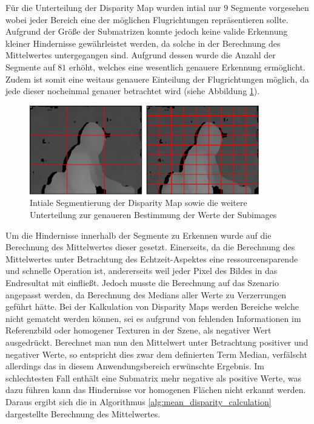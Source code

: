 \noindent
Für die Unterteilung der Disparity Map wurden intial nur $9$ Segmente vorgesehen wobei jeder Bereich eine der möglichen Flugrichtungen repräsentieren sollte. Aufgrund der Größe der Submatrizen konnte jedoch keine valide Erkennung kleiner Hindernisse gewährleistet werden, da solche in der Berechnung des Mittelwertes untergegangen sind. Aufgrund dessen wurde die Anzahl der Segmente auf $81$ erhöht, welches eine wesentlich genauere Erkennung ermöglicht. Zudem ist somit eine weitaus genauere Einteilung der Flugrichtungen möglich, da jede dieser nocheinmal genauer betrachtet wird (siehe Abbildung \ref{fig:subimage_detection_segments}).

\begin{figure}[h]
	\begin{center}
		\includegraphics[width=10cm]{img/subimage_segmentation.pdf}
	\end{center}
	\caption{Intiale Segmentierung der Disparity Map sowie die weitere Unterteilung zur genaueren Bestimmung der Werte der Subimages}
	\label{fig:subimage_detection_segments}
\end{figure}

\noindent
Um die Hindernisse innerhalb der Segmente zu Erkennen wurde auf die Berechnung des Mittelwertes dieser gesetzt. Einerseits, da die Berechnung des Mittelwertes unter Betrachtung des Echtzeit-Aspektes eine ressourcensparende und schnelle Operation ist, andererseits weil jeder Pixel des Bildes in das Endresultat mit einfließt. Jedoch musste die Berechnung auf das Szenario angepasst werden, da Berechnung des Medians aller Werte zu Verzerrungen geführt hätte. Bei der Kalkulation von Disparity Maps werden Bereiche welche nicht gematcht werden können, sei es aufgrund von fehlenden Informationen im Referenzbild oder homogener Texturen in der Szene, als negativer Wert ausgedrückt. Berechnet man nun den Mittelwert unter Betrachtung positiver und negativer Werte, so entspricht dies zwar dem definierten Term Median, verfälscht allerdings das in diesem Anwendungsbereich erwünschte Ergebnis. Im schlechtesten Fall enthält eine Submatrix mehr negative als positive Werte, was dazu führen kann das Hindernisse vor homogenen Flächen nicht erkannt werden. Daraus ergibt sich die in Algorithmus \ref{alg:mean_disparity_calculation} dargestellte Berechnung des Mittelwertes.

